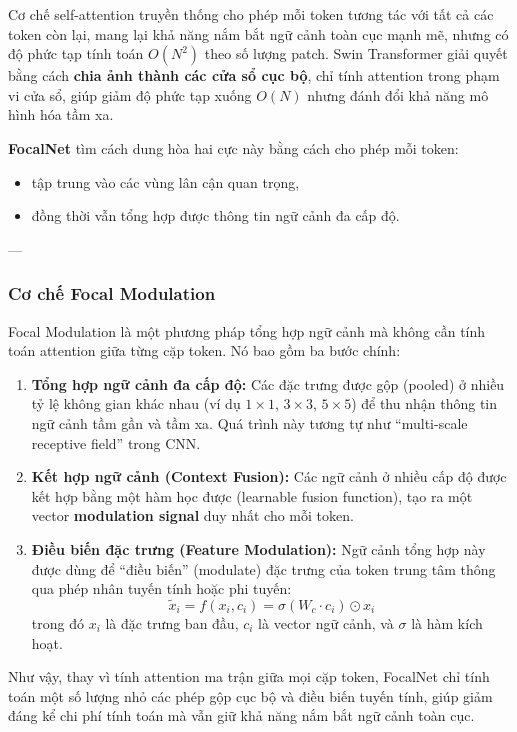Cơ chế self-attention truyền thống cho phép mỗi token tương tác với tất cả các token còn lại, mang lại khả năng nắm bắt ngữ cảnh toàn cục mạnh mẽ, nhưng có độ phức tạp tính toán $O(N^2)$ theo số lượng patch.  
Swin Transformer giải quyết bằng cách \textbf{chia ảnh thành các cửa sổ cục bộ}, chỉ tính attention trong phạm vi cửa sổ, giúp giảm độ phức tạp xuống $O(N)$ nhưng đánh đổi khả năng mô hình hóa tầm xa.

\textbf{FocalNet} tìm cách dung hòa hai cực này bằng cách cho phép mỗi token:
\begin{itemize}
	\item tập trung vào các vùng lân cận quan trọng,
	\item đồng thời vẫn tổng hợp được thông tin ngữ cảnh đa cấp độ.
\end{itemize}

---

\subsubsection{Cơ chế Focal Modulation}
\label{subsubsec:focal_modulation}

Focal Modulation là một phương pháp tổng hợp ngữ cảnh mà không cần tính toán attention giữa từng cặp token.  
Nó bao gồm ba bước chính:

\begin{enumerate}
	\item \textbf{Tổng hợp ngữ cảnh đa cấp độ:}  
	Các đặc trưng được gộp (pooled) ở nhiều tỷ lệ không gian khác nhau (ví dụ $1 \times 1$, $3 \times 3$, $5 \times 5$) để thu nhận thông tin ngữ cảnh tầm gần và tầm xa.  
	Quá trình này tương tự như “multi-scale receptive field” trong CNN.
	
	\item \textbf{Kết hợp ngữ cảnh (Context Fusion):}  
	Các ngữ cảnh ở nhiều cấp độ được kết hợp bằng một hàm học được (learnable fusion function), tạo ra một vector \textbf{modulation signal} duy nhất cho mỗi token.
	
	\item \textbf{Điều biến đặc trưng (Feature Modulation):}  
	Ngữ cảnh tổng hợp này được dùng để “điều biến” (modulate) đặc trưng của token trung tâm thông qua phép nhân tuyến tính hoặc phi tuyến:
	\[
	\tilde{x}_i = f(x_i, c_i) = \sigma(W_c \cdot c_i) \odot x_i
	\]
	trong đó $x_i$ là đặc trưng ban đầu, $c_i$ là vector ngữ cảnh, và $\sigma$ là hàm kích hoạt.
\end{enumerate}

Như vậy, thay vì tính attention ma trận giữa mọi cặp token, FocalNet chỉ tính toán một số lượng nhỏ các phép gộp cục bộ và điều biến tuyến tính, giúp giảm đáng kể chi phí tính toán mà vẫn giữ khả năng nắm bắt ngữ cảnh toàn cục.

